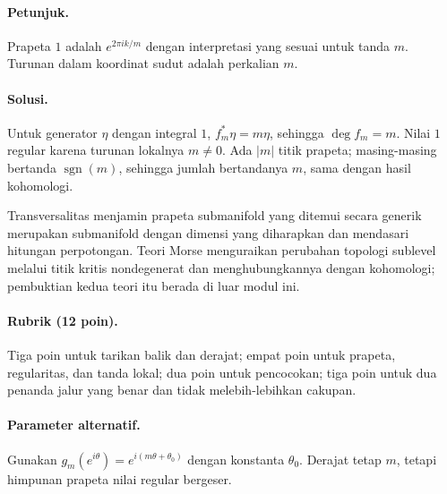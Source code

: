 \paragraph{Petunjuk.}
Prapeta $1$ adalah $e^{2\pi ik/m}$ dengan interpretasi yang sesuai untuk tanda
$m$. Turunan dalam koordinat sudut adalah perkalian $m$.

\paragraph{Solusi.}
Untuk generator $\eta$ dengan integral $1$,
$f_m^*\eta=m\eta$, sehingga $\deg f_m=m$. Nilai $1$ regular karena turunan
lokalnya $m\ne0$. Ada $|m|$ titik prapeta; masing-masing bertanda
$\operatorname{sgn}(m)$, sehingga jumlah bertandanya $m$, sama dengan hasil
kohomologi.

Transversalitas menjamin prapeta submanifold yang ditemui secara generik
merupakan submanifold dengan dimensi yang diharapkan dan mendasari hitungan
perpotongan. Teori Morse menguraikan perubahan topologi sublevel melalui titik
kritis nondegenerat dan menghubungkannya dengan kohomologi; pembuktian kedua
teori itu berada di luar modul ini.

\paragraph{Rubrik (12 poin).}
Tiga poin untuk tarikan balik dan derajat; empat poin untuk prapeta, regularitas,
dan tanda lokal; dua poin untuk pencocokan; tiga poin untuk dua penanda jalur
yang benar dan tidak melebih-lebihkan cakupan.

\paragraph{Parameter alternatif.}
Gunakan $g_m(e^{i\theta})=e^{i(m\theta+\theta_0)}$ dengan konstanta
$\theta_0$. Derajat tetap $m$, tetapi himpunan prapeta nilai regular bergeser.
